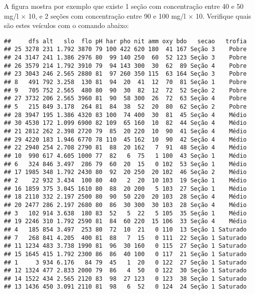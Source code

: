 \documentclass[
]{book}
\newenvironment{Shaded}{\begin{snugshade}}{\end{snugshade}}
\newcommand{\FunctionTok}[1]{\textcolor[rgb]{0.00,0.00,0.00}{#1}}
\newcommand{\NormalTok}[1]{#1}
\newcommand{\SpecialCharTok}[1]{\textcolor[rgb]{0.00,0.00,0.00}{#1}}
\begin{document}
A figura mostra por exemplo que existe 1 seção com concentração entre 40 e 50 mg/l \(\times\) 10, e 2 seções com concentração entre 90 e 100 mg/l \(\times\) 10. Verifique quais são estes veículos com o comando abaixo:

\begin{Shaded}
\end{Shaded}

\begin{verbatim}
##     dfs alt   slo  flo pH har pho nit amm oxy bdo   secao   trofia
## 25 3278 231 1.792 3870 79 100 422 620 180  41 167 Seção 3    Pobre
## 24 3147 241 1.386 2976 80  99 140 250  60  52 123 Seção 3    Pobre
## 26 3579 214 1.792 3910 79  94 143 300  30  62  89 Seção 4    Pobre
## 23 3043 246 2.565 2880 81  97 260 350 115  63 164 Seção 3    Pobre
## 8   491 792 3.258  130 81  94  20  41  12  70  81 Seção 1    Pobre
## 9   705 752 2.565  480 80  90  30  82  12  72  52 Seção 2    Pobre
## 27 3732 206 2.565 3960 81  90  58 300  26  72  63 Seção 4    Pobre
## 5   215 849 3.178  264 81  84  38  52  20  80  62 Seção 2    Pobre
## 28 3947 195 1.386 4320 83 100  74 400  30  81  45 Seção 4    Médio
## 30 4530 172 1.099 6900 82 109  65 160  10  82  44 Seção 4    Médio
## 21 2812 262 2.398 2720 79  85  20 220  10  90  41 Seção 4    Médio
## 29 4220 183 1.946 6770 78 110  45 162  10  90  42 Seção 4    Médio
## 22 2940 254 2.708 2790 81  88  20 162   7  91  48 Seção 4    Médio
## 10  990 617 4.605 1000 77  82   6  75   1 100  43 Seção 1    Médio
## 6   324 846 3.497  286 79  60  20  15   0 102  53 Seção 1    Médio
## 17 1985 348 1.792 2430 80  92  20 250  20 102  46 Seção 2    Médio
## 2    22 932 3.434  100 80  40   2  20  10 103  19 Seção 1    Médio
## 16 1859 375 3.045 1610 80  88  20 200   5 103  27 Seção 1    Médio
## 18 2110 332 2.197 2500 80  90  50 220  20 103  28 Seção 4    Médio
## 20 2477 286 2.197 2680 80  86  30 300  30 103  28 Seção 4    Médio
## 3   102 914 3.638  180 83  52   5  22   5 105  35 Seção 1    Médio
## 19 2246 310 1.792 2590 81  84  60 220  15 106  33 Seção 4    Médio
## 4   185 854 3.497  253 80  72  10  21   0 110  13 Seção 1 Saturado
## 7   268 841 4.205  400 81  88   7  15   0 111  22 Seção 1 Saturado
## 11 1234 483 3.738 1990 81  96  30 160   0 115  27 Seção 1 Saturado
## 15 1645 415 1.792 2300 86  86  40 100   0 117  21 Seção 1 Saturado
## 1     3 934 6.176   84 79  45   1  20   0 122  27 Seção 1 Saturado
## 12 1324 477 2.833 2000 79  86   4  50   0 122  30 Seção 1 Saturado
## 14 1522 434 2.565 2120 83  98  27 123   0 123  38 Seção 1 Saturado
## 13 1436 450 3.091 2110 81  98   6  52   0 124  24 Seção 1 Saturado
\end{verbatim}
\end{document}
